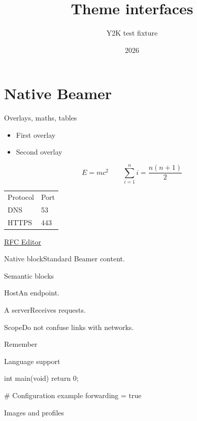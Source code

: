 \documentclass[aspectratio=\TestAspect]{beamer}
\title{Theme interfaces}\author{Y2K test fixture}\date{2026}
\begin{document}
\begin{frame}[plain]\titlepage\end{frame}
\section{Native Beamer}
\begin{frame}{Overlays, maths, tables}
  \begin{itemize}
    \item<1-> First overlay
    \item<2-> Second overlay
  \end{itemize}
  \[E=mc^2\qquad \sum_{i=1}^{n}i=\frac{n(n+1)}{2}\]
  \begin{tabular}{ll}Protocol&Port\\DNS&53\\HTTPS&443\end{tabular}
  \par\href{https://www.rfc-editor.org}{RFC Editor}
  \begin{block}{Native block}Standard Beamer content.\end{block}
\end{frame}
\begin{frame}{Semantic blocks}
  \begin{YTwoKDefinition}{Host}An endpoint.\end{YTwoKDefinition}
  \begin{YTwoKExample}{A server}Receives requests.\end{YTwoKExample}
  \begin{YTwoKWarning}{Scope}Do not confuse links with networks.\end{YTwoKWarning}
  \begin{YTwoKCallout}{Remember}\end{YTwoKCallout}
\end{frame}
\begin{frame}[fragile]{Language support}
  \begin{YTwoKCode}[language=C]
int main(void) { return 0; }
  \end{YTwoKCode}
  \begin{YTwoKCode}[language=Y2KConfig]
# Configuration example
forwarding = true
  \end{YTwoKCode}
\end{frame}
\begin{frame}{Images and profiles}
\end{frame}
\end{document}
